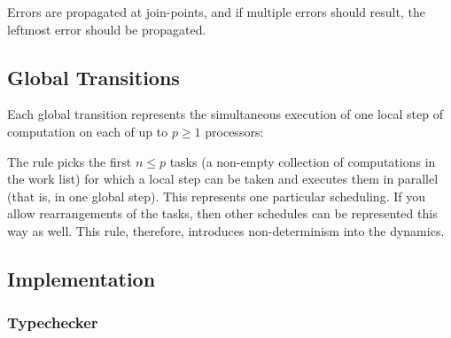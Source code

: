 Errors are propagated at join-points, and if multiple errors should result, the leftmost error
should be propagated.

\begin{mathpar}
\end{mathpar}

\subsection{Global Transitions}

Each global transition represents the
simultaneous execution of one local step of computation on each of up to
$p\geq 1$ processors:
\begin{mathpar}
\end{mathpar}
The rule picks the first $n \leq p$ tasks (a non-empty collection of
computations in the work list) for which a local step can be taken and executes
them in parallel (that is, in one global step). This represents one particular
scheduling. If you allow rearrangements of the tasks, then other schedules can
be represented this way as well. This rule, therefore, introduces
non-determinism into the \LangPPCFv{} dynamics.

\subsection{Implementation}

\subsubsection{Typechecker}


